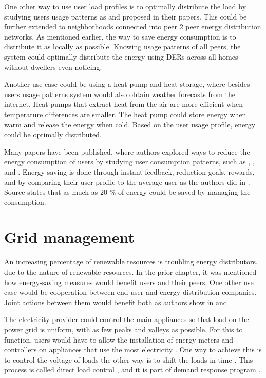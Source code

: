 \documentclass[
11pt, %
english, %
singlespacing, %
headsepline, %
]{MastersDoctoralThesis} %
\begin{document}
One other way to use user load profiles is to optimally distribute the load by studying users usage patterns as \cite{Chuan2014} and \cite{shift2015} proposed in their papers. 
This could be further extended to neighborhoods connected into peer 2 peer energy distribution networks.
As mentioned earlier, the way to save energy consumption is to distribute it as locally as possible. 
Knowing usage patterns of all peers, the system could optimally distribute the energy using DERs across all homes without dwellers even noticing.

Another use case could be using a heat pump and heat storage,
where besides users usage patterns system would also obtain weather forecasts from the internet.
Heat pumps that extract heat from the air are more efficient when temperature differences are smaller. 
The heat pump could store energy when warm and release the energy when cold.
Based on the user usage profile, energy could be optimally distributed.

Many papers have been published, where authors explored ways to reduce the energy consumption of users by studying user consumption patterns,
such as \cite{energy_saving3}, \cite{energy_saving1}, \cite{energy_saving4} and \cite{energy_saving3}.
Energy saving is done through instant feedback, reduction goals, rewards, and by comparing their user profile to the average user as the authors did in \cite{Csoknyai2019}.
Source \cite{eu2006} states that as much as 20 \% of energy could be saved by managing the consumption.

\section{Grid management}

An increasing percentage of renewable resources is troubling energy distributors, due to the nature of renewable resources.
In the prior chapter, it was mentioned how energy-saving measures would benefit users and their peers.
One other use case would be cooperation between end-user and energy distribution companies.
Joint actions between them would benefit both as authors show in \cite{cooperation2008} and \cite{cooperation2010}

The electricity provider could control the main appliances so that load on the power grid is uniform,
with as few peaks and valleys as possible. For this to function, users would have to allow the installation of energy meters and controllers 
on appliances that use the most electricity \cite{gridDirectControll2015}. One way to achieve this is to control the voltage of loads \cite{controll2014} the other
way is to shift the loads in time \cite{shift2015}.
This process is called direct load control \cite{DirectLoadControll2021}, and it is part of demand response program \cite{DemandResponse2018}.
\end{document}
